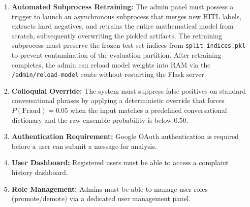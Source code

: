 \begin{enumerate}
    \item \textbf{Automated Subprocess Retraining:} The admin panel must possess a trigger to launch an asynchronous subprocess that merges new HITL labels, extracts hard negatives, and retrains the entire mathematical model from scratch, subsequently overwriting the pickled artifacts. The retraining subprocess must preserve the frozen test set indices from \texttt{split\_indices.pkl} to prevent contamination of the evaluation partition. After retraining completes, the admin can reload model weights into RAM via the \texttt{/admin/reload-model} route without restarting the Flask server.
    \item \textbf{Colloquial Override:} The system must suppress false positives on standard conversational phrases by applying a deterministic override that forces $P(\text{Fraud}) = 0.05$ when the input matches a predefined conversational dictionary and the raw ensemble probability is below $0.50$.
    \item \textbf{Authentication Requirement:} Google OAuth authentication is required before a user can submit a message for analysis.
    \item \textbf{User Dashboard:} Registered users must be able to access a complaint history dashboard.
    \item \textbf{Role Management:} Admins must be able to manage user roles (promote/demote) via a dedicated user management panel.
\end{enumerate}


